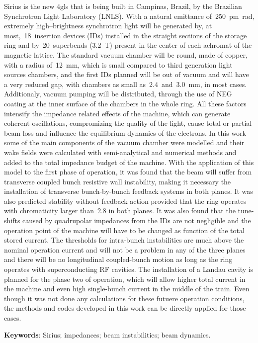 \begin{resumo}
    Sirius is the new \gls{4gls} that is being built in Campinas, Brazil, by the Brazilian Synchrotron Light Laboratory (LNLS). With a natural emittance of~\SI{250}{\pico\meter\radian}, extremely high--brightness synchrotron light will be generated by, at most,~\SI{18}{}~insertion devices (IDs) installed in the straight sections of the storage ring and by~\SI{20}{}~superbends (\SI{3.2}{\tesla}) present in the center of each achromat of the magnetic lattice. The standard vacuum chamber will be round, made of copper, with a radius of~\SI{12}{\milli\meter}, which is small compared to third generation light sources chambers, and the first IDs planned will be out of vacuum and will have a very reduced gap, with chambers as small as~\SI{2.4}{}~and~\SI{3.0}{\milli\meter}, in most cases. Additionaly, vacuum pumping will be distributed, through the use of NEG coating at the inner surface of the chambers in the whole ring. All these factors intensify the impedance related effects of the machine, which can generate coherent oscillations, compromizing the quality of the light, cause total or partial beam loss and influence the equilibrium dynamics of the electrons. In this work some of the main components of the vacuum chamber were modelled and their wake fields were calculated with semi-analytical and numerical methods and added to the total impedance budget of the machine. With the application of this model to the first phase of operation, it was found that the beam will suffer from transverse coupled bunch resistive wall instability, making it necessary the installation of transverse bunch-by-bunch feedback systems in both planes. It was also predicted stability without feedback action provided that the ring operates with chromaticity larger than~\SI{2.8}{} in both planes. It was also found that the tune-shifts caused by quadrupolar impedances from the IDs are not negligible and the operation point of the machine will have to be changed as function of the total stored current. The thresholds for intra-bunch instabilities are much above the nominal operation current and will not be a problem in any of the three planes and there will be no longitudinal coupled-bunch motion as long as the ring operates with superconducting RF cavities. The installation of a Landau cavity is planned for the phase two of operation, which will allow higher total current in the machine and even high single-bunch current in the middle of the train. Even though it was not done any calculations for these futuere operation conditions, the methods and codes developed in this work can be directly applied for those cases.

    \noindent\textbf{Keywords}: Sirius; impedances; beam instabilities; beam dynamics.
    \vspace{\fill}
\end{resumo}

